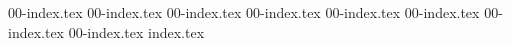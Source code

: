 {00-index.tex}
{00-index.tex}
{00-index.tex}
{00-index.tex}
{00-index.tex}
{00-index.tex}
{00-index.tex}
{00-index.tex}
{index.tex}



\begin{appendices}
    
\end{appendices}
